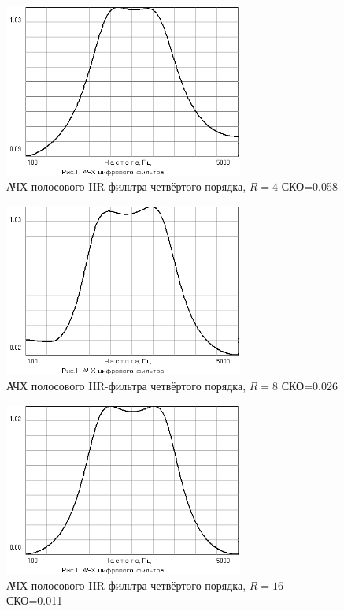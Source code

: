 \begin{figure}[H]
  \centering
  \includegraphics[width=0.7\textwidth]{data/Z1_PPF/gain_IIR_4p_R4.png}
  \caption{АЧХ полосового IIR-фильтра четвёртого порядка, $R=4$ СКО=0.058}
  \label{fig:}
\end{figure}
\begin{figure}[H]
  \centering
  \includegraphics[width=0.7\textwidth]{data/Z1_PPF/gain_IIR_4p_R8.png}
  \caption{АЧХ полосового IIR-фильтра четвёртого порядка, $R=8$ СКО=0.026}
  \label{fig:}
\end{figure}
\begin{figure}[H]
  \centering
  \includegraphics[width=0.7\textwidth]{data/Z1_PPF/gain_IIR_4p_R16.png}
  \caption{АЧХ полосового IIR-фильтра четвёртого порядка, $R=16$ СКО=0.011}
  \label{fig:}
\end{figure}

